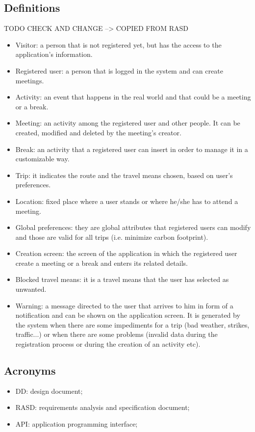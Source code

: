 \documentclass[12pt,titlepage]{article}
\begin{document}
\subsection{Definitions} TODO CHECK AND CHANGE --> COPIED FROM RASD
\begin{itemize}
\item Visitor: a person that is not registered yet, but has the access to the application’s information.
\item Registered user: a person that is logged in the system and can create meetings.
\item Activity: an event that happens in the real world and that could be a meeting or a break.
\item Meeting: an activity among the registered user and other people. It can be created, modified and deleted by the meeting’s creator.
\item Break: an activity that a registered user can insert in order to manage it in a customizable way.
\item Trip: it indicates the route and the travel means chosen, based on user’s preferences.
\item Location: fixed place where a user stands or where he/she has to attend a meeting.
\item Global preferences: they are global attributes that registered users can modify and those are valid for all trips (i.e. minimize carbon footprint).
\item Creation screen: the screen of the application in which the registered user create a meeting or a break and enters its related details.
\item Blocked travel means: it is a travel means that the user has selected as unwanted.
\item Warning: a message directed to the user that arrives to him in form of a notification and can be shown on the application screen. It is generated by the system when there are some impediments for a trip (bad weather, strikes, traffic...) or when there are some problems (invalid data during the registration process or during the creation of an activity etc).
\end{itemize}
\subsection{Acronyms}
\begin{itemize}
\item DD: design document;
\item RASD: requirements analysis and specification document;
\item API: application programming interface;
\end{itemize}
\end{document}
